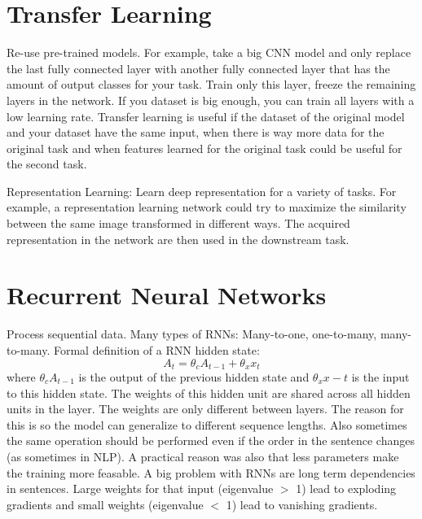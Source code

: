 \documentclass{scrartcl}
\begin{document}
\section*{Transfer Learning}
Re-use pre-trained models. For example, take a big CNN model and only replace the last fully connected layer with another fully connected layer that has the amount of output classes for your task. Train only this layer, freeze the remaining layers in the network. If you dataset is big enough, you can train all layers with a low learning rate.
Transfer learning is useful if the dataset of the original model and your dataset have the same input, when there is way more data for the original task and when features learned for the original task could be useful for the second task.

Representation Learning: Learn deep representation for a variety of tasks. For example, a representation learning network could try to maximize the similarity between the same image transformed in different ways. The acquired representation in the network are then used in the downstream task.


\section*{Recurrent Neural Networks}
Process sequential data.
Many types of RNNs: Many-to-one, one-to-many, many-to-many.
Formal definition of a RNN hidden state:
$$A_t = \theta_c A_{t-1} + \theta_x x_t$$
where $\theta_c A_{t-1}$ is the output of the previous hidden state and $\theta_x x-t$ is the input to this hidden state. The weights of this hidden unit are shared across all hidden units in the layer. The weights are only different between layers. The reason for this is so the model can generalize to different sequence lengths. Also sometimes the same operation should be performed even if the order in the sentence changes (as sometimes in NLP). A practical reason was also that less parameters make the training more feasable.
A big problem with RNNs are long term dependencies in sentences. Large weights for that input (eigenvalue $>$ 1) lead to exploding gradients and small weights (eigenvalue $<$ 1) lead to vanishing gradients.
\end{document}
